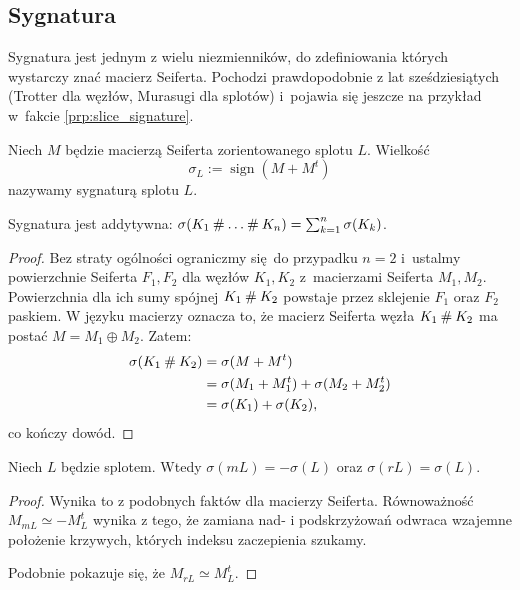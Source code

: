 \subsection{Sygnatura}
\label{sub:signature}
Sygnatura jest jednym z wielu niezmienników, do zdefiniowania których wystarczy znać macierz Seiferta.
Pochodzi prawdopodobnie z lat sześdziesiątych (Trotter \cite{trotter62} dla węzłów, Murasugi \cite{murasugi65} dla splotów) i~pojawia się jeszcze na przykład w~fakcie \ref{prp:slice_signature}.

\begin{definition}[sygnatura]
    Niech $M$ będzie macierzą Seiferta zorientowanego splotu $L$.
    Wielkość
    \begin{equation}
        \sigma_L := \operatorname{sign} (M + M^t)
    \end{equation}
    nazywamy sygnaturą splotu $L$.
\end{definition}

\begin{proposition}
    \label{prp:signature_additive}
    Sygnatura jest addytywna: $\sigma(K_1 \mathbin{\#} \ldots \mathbin{\#} K_n) = \sum_{k=1}^n \sigma(K_k)$.
\end{proposition}

\begin{proof}
    Bez straty ogólności ograniczmy się do przypadku $n = 2$ i~ustalmy powierzchnie Seiferta $F_1, F_2$ dla węzłów $K_1, K_2$ z~macierzami Seiferta $M_1, M_2$.
    Powierzchnia dla ich sumy spójnej $K_1 \mathbin{\#} K_2$ powstaje przez sklejenie $F_1$ oraz $F_2$ paskiem.
    W języku macierzy oznacza to, że macierz Seiferta węzła $K_1 \mathbin{\#} K_2$ ma postać $M = M_1 \oplus M_2$.
    Zatem:
    \begin{align}
        \sigma(K_1 \mathbin{\#} K_2) & = \sigma(M + M^t) \\
                               & = \sigma(M_1 + M_1^t) + \sigma(M_2 + M_2^t) \\
                               & = \sigma(K_1) + \sigma(K_2),
    \end{align}
    co kończy dowód.
\end{proof}

\begin{proposition}
    \label{prp:signature_mirror_reverse}
    Niech $L$ będzie splotem.
    Wtedy $\sigma(mL) = -\sigma(L)$ oraz $\sigma(rL) = \sigma(L)$.
\end{proposition}

\begin{proof}
    Wynika to z podobnych faktów dla macierzy Seiferta.
    Równoważność $M_{mL} \simeq - M_L^t$ wynika z tego, że zamiana nad- i podskrzyżowań odwraca wzajemne położenie krzywych, których indeksu zaczepienia szukamy.

    Podobnie pokazuje się, że $M_{rL} \simeq M_L^t$.
\end{proof}

